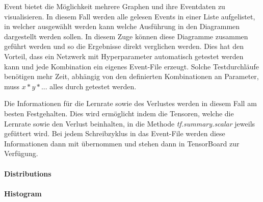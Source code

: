 \noindent
Event bietet die Möglichkeit mehrere Graphen und ihre Eventdaten zu visualisieren. 
In diesem Fall werden alle gelesen Events in einer Liste aufgelistet, in welcher ausgewählt werden kann welche Ausführung in den Diagrammen dargestellt werden sollen. 
In diesem Zuge können diese Diagramme zusammen geführt werden und so die Ergebnisse direkt verglichen werden. 
Dies hat den Vorteil, dass ein Netzwerk mit Hyperparameter automatisch getestet werden kann und jede Kombination ein eigenes Event-File erzeugt. 
Solche Testdurchläufe benötigen mehr Zeit, abhängig von den definierten Kombinationen an Parameter, muss $x * y * ...$ alles durch getestet werden.
\phantom \newline

\noindent
Die Informationen für die Lernrate sowie des Verlustes werden in diesem Fall am besten Festgehalten. 
Dies wird ermöglicht indem die Tensoren, welche die Lernrate sowie den Verlust beinhalten, in die Methode \textit{tf.summary.scalar} jeweils gefüttert wird. 
Bei jedem Schreibzyklus in das Event-File werden diese Informationen dann mit übernommen und stehen dann in TensorBoard zur Verfügung.

\paragraph{Distributions} %

\paragraph{Histogram} 















